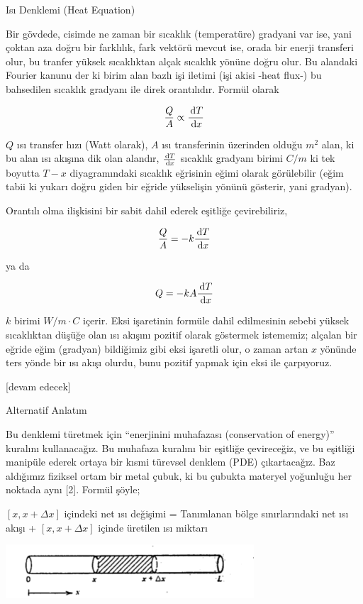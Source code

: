 \documentclass[12pt,fleqn]{article}\usepackage{../../common}
\begin{document}
Isı Denklemi (Heat Equation)

Bir gövdede, cisimde ne zaman bir sıcaklık (temperatüre) gradyani var ise, yani
çoktan aza doğru bir farklılık, fark vektörü mevcut ise, orada bir enerji
transferi olur, bu tranfer yüksek sıcaklıktan alçak sıcaklık yönüne doğru
olur. Bu alandaki Fourier kanunu der ki birim alan bazlı işi iletimi (işi akisi
-heat flux-) bu bahsedilen sıcaklık gradyanı ile direk orantılıdır. Formül
olarak

$$
\frac{Q}{A} \propto \frac{\,\mathrm{d} T}{\,\mathrm{d} x}
$$

$Q$ ısı transfer hızı (Watt olarak), $A$ ısı transferinin üzerinden olduğu $m^2$
alan, ki bu alan ısı akışına dik olan alandır, $\frac{\,\mathrm{d} T}{\,\mathrm{d} x}$ sıcaklık
gradyanı birimi $C / m$ ki tek boyutta $T-x$ diyagramındaki sıcaklık eğrisinin
eğimi olarak görülebilir (eğim tabii ki yukarı doğru giden bir eğride yükselişin
yönünü gösterir, yani gradyan).

Orantılı olma ilişkisini bir sabit dahil ederek eşitliğe çevirebiliriz,

$$
\frac{Q}{A} = -k \frac{\,\mathrm{d} T}{\,\mathrm{d} x}
$$

ya da

$$
Q = -k A \frac{\,\mathrm{d} T}{\,\mathrm{d} x}
$$

$k$ birimi $W/m \cdot C$ içerir. Eksi işaretinin formüle dahil edilmesinin sebebi
yüksek sıcaklıktan düşüğe olan ısı akışını pozitif olarak göstermek istememiz;
alçalan bir eğride eğim (gradyan) bildiğimiz gibi eksi işaretli olur, o zaman
artan $x$ yönünde ters yönde bir ısı akışı olurdu, bunu pozitif yapmak için eksi
ile çarpıyoruz.



[devam edecek]

Alternatif Anlatım

Bu denklemi türetmek için ``enerjinini muhafazası (conservation of
energy)'' kuralını kullanacağız. Bu muhafaza kuralını bir eşitliğe
çevireceğiz, ve bu eşitliği manipüle ederek ortaya bir kısmi türevsel
denklem (PDE) çıkartacağız. Baz aldığımız fiziksel ortam bir metal çubuk,
ki bu çubukta materyel yoğunluğu her noktada aynı [2].  Formül şöyle;

$[x,x+\Delta x]$ içindeki net ısı değişimi = Tanımlanan bölge
sınırlarındaki net ısı akışı + $[x,x+\Delta x]$ içinde üretilen ısı miktarı

\includegraphics[height=2cm]{heat_1.png}
\end{document}
